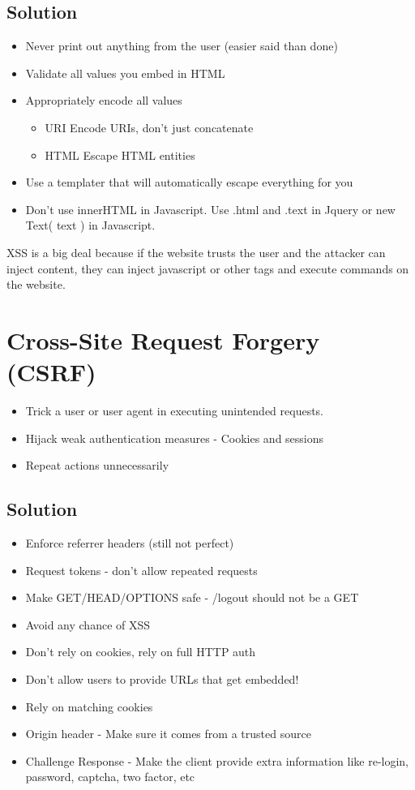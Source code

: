 \documentclass[../CMPUT-404-Notes.tex]{subfiles}
\begin{document}
\subsection{Solution}
\begin{itemize}
    \item Never print out anything from the user (easier said than done)
    \item Validate all values you embed in HTML
    \item Appropriately encode all values
    \begin{itemize}
        \item URI Encode URIs, don't just concatenate
        \item HTML Escape HTML entities
    \end{itemize}
    \item Use a templater that will automatically escape everything for
    you
    \item Don't use innerHTML in Javascript. Use .html and .text in
    Jquery or new Text( text ) in Javascript.
\end{itemize}
XSS is a big deal because if the website trusts the user and the attacker can inject content, they can inject javascript or other tags and execute commands on the website.

\section{Cross-Site Request Forgery (CSRF)}
\begin{itemize}
    \item Trick a user or user agent in executing
    unintended requests.
    \item Hijack weak authentication measures - Cookies and sessions
    \item Repeat actions unnecessarily
\end{itemize}

\subsection{Solution}
\begin{itemize}
    \item Enforce referrer headers (still not perfect)
    \item Request tokens - don't allow repeated requests
    \item Make GET/HEAD/OPTIONS safe - /logout should not be a GET
    \item Avoid any chance of XSS
    \item Don't rely on cookies, rely on full HTTP auth
    \item Don't allow users to provide URLs that get embedded!
    \item Rely on matching cookies
    \item Origin header - Make sure it comes from a trusted source
    \item Challenge Response - Make the client provide extra information like re-login, password, captcha, two factor, etc
\end{itemize}
\end{document}
